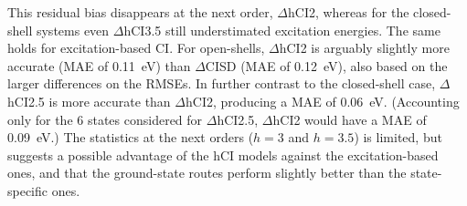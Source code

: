 \documentclass[aip,jcp,reprint,noshowkeys,superscriptaddress]{revtex4-1}
\begin{document}
This residual bias disappears at the next order, $\Delta$hCI2, whereas for the closed-shell systems even $\Delta$hCI3.5 still understimated excitation energies. 
The same holds for excitation-based CI.
For open-shells, $\Delta$hCI2 is arguably slightly more accurate (MAE of \SI{0.11}{\eV}) than $\Delta$CISD (MAE of \SI{0.12}{\eV}), also based on the larger differences on the RMSEs.
In further contrast to the closed-shell case,
$\Delta$hCI2.5 is more accurate than $\Delta$hCI2, producing a MAE of \SI{0.06}{\eV}.
(Accounting only for the 6 states considered for $\Delta$hCI2.5, $\Delta$hCI2 would have a MAE of \SI{0.09}{\eV}.)
The statistics at the next orders ($h=3$ and $h=3.5$) is limited, 
but suggests a possible advantage of the hCI models against the excitation-based ones,
and that the ground-state routes perform slightly better than the state-specific ones.
\end{document}
